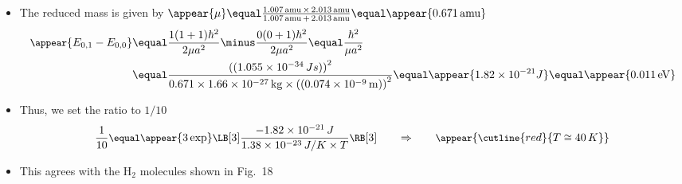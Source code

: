 \begin{frame}
\frametitle{\texorpdfstring{\culine[\sectiontitleulinecolor]{\sectiontitle}}{\sectiontitle} }

\begin{itemize}[itemsep=1.7mm]
	\item The reduced mass is given by
	$
\appear{\mu}  \equal \frac{1.007 \mathrm{\,amu} \,\times\, 2.013 \mathrm{\,amu}}{1.007 \mathrm{\,amu} \,+\,2.013 \mathrm{\,amu}}  \equal \appear{0.671 \mathrm{\,amu}}
$
	$$
	 \begin{aligned}  \small
	 \appear{E_{0,1}-E_{0,0}} & \equal \frac{1(1+1) \hbar^{2}}{2 \mu a^{2}}  \minus \frac{0(0+1) \hbar^{2}}{2 \mu a^{2}}  \equal \frac{\hbar^{2}}{\mu a^{2}} \\
	 & \equal \frac{ \textrm{((}1.055 \times 10^{-34} \,Js \textrm{))}^{2}}{0.671 \times 1.66 \times 10^{-27} \mathrm{\,kg} \times \textrm{((}0.074 \times 10^{-9} \mathrm{\,m} \textrm{))}^{2}}  \equal \appear{1.82 \times 10^{-21} J}  \equal \appear{0.011 \mathrm{\,eV}}
	 \end{aligned} 
	 $$ 
	
\item Thus, we set the ratio to $1 / 10$ 
\[ \small
\frac{1}{10}  \equal \appear{3 \exp}  \LB[3] \frac{-1.82 \times 10^{-21} \,J}{1.38 \times 10^{-23} \,J / K \times T} \RB[3] \qquad \Rightarrow \qquad \appear{ \cutline{red}{T \cong 40 \,K}}
\]
\vspace{-2mm} 

\item This agrees with the $\mathrm{H}_{2}$ molecules shown in Fig.~18
\end{itemize}

\endofslide 
\end{frame}

